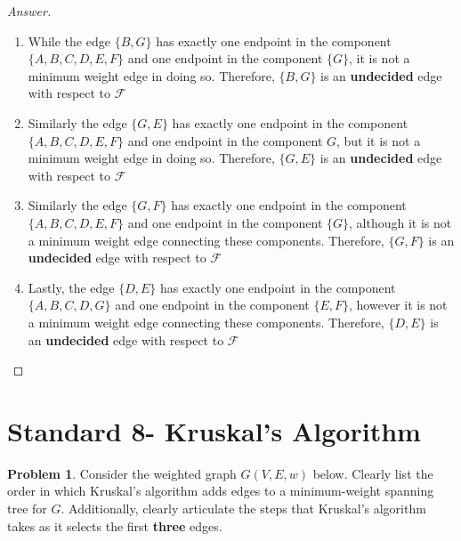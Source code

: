 \documentclass[11pt]{article}
\theoremstyle{definition}
\theoremstyle{definition}
\newtheorem{required}{Problem}
\theoremstyle{definition}
\begin{document}
\begin{proof}[Answer]
\begin{enumerate}
\item While the edge $\{B,G\}$ has exactly one endpoint in the component $\{A,B,C,D,E,F\}$ and one endpoint in the component $\{G\}$, it is not a minimum weight edge in doing so. Therefore, $\{B,G\}$ is an \textbf{undecided} edge with respect to  $\mathcal{F}$
\item Similarly the edge $\{G,E\}$ has exactly one endpoint in the component $\{A,B,C,D,E,F\}$ and one endpoint in the component ${G}$, but it is not a minimum weight edge in doing so. Therefore, $\{G,E\}$ is an \textbf{undecided} edge with respect to  $\mathcal{F}$
\item Similarly the edge $\{G,F\}$ has exactly one endpoint in the component $\{A,B,C,D,E,F\}$ and one endpoint in the component $\{G\}$, although it is not a minimum weight edge connecting these components. Therefore, $\{G,F\}$ is an \textbf{undecided} edge with respect to  $\mathcal{F}$
\item Lastly, the edge $\{D,E\}$ has exactly one endpoint in the component $\{A,B,C,D,G\}$ and one endpoint in the component $\{E,F\}$, however it is not a minimum weight edge connecting these components. Therefore, $\{D,E\}$ is an \textbf{undecided} edge with respect to  $\mathcal{F}$



\end{enumerate}
\end{proof}

 
\newpage
\section{Standard 8- Kruskal's Algorithm}

\begin{required}
Consider the weighted graph $G(V, E, w)$ below. Clearly list the order in which Kruskal's algorithm adds edges to a minimum-weight spanning tree for $G$. Additionally, clearly articulate the steps that Kruskal's algorithm takes as it selects the first \textbf{three} edges.

\begin{center}
\end{center}
\end{required}
\end{document}
